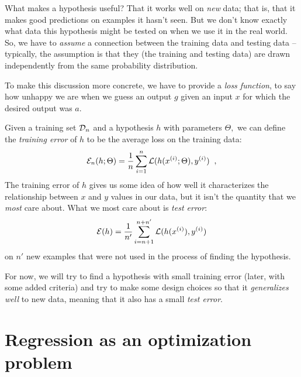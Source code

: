 What makes a hypothesis useful? That it works well on {\em new} data;
that is, that it makes good predictions on examples it hasn't
  seen. 
But we don't know exactly what data this hypothesis might be tested on
when we use it in the real world. So, we have to {\em{assume}} a
connection between the training data and testing data -- typically, the assumption is that
they (the training and testing data) are drawn independently from the same probability distribution.

To make this discussion more concrete, we have to provide a {\em loss
    function}, to say how unhappy we are when we guess an output $g$
given an input $x$ for which the desired output was $a$.

Given a training set ${\cal D}_n$ and a hypothesis $h$ with parameters $\Theta,$ we can define the
  {\em training error} of $h$ to be the average loss on the training data:
\begin{eqnarray}\label{erm}
  \mathcal{E}_n(h; \Theta) =  \frac{1}{n}\sum_{i = 1}^n
  \mathcal{L}(h(x^{(i)};\Theta), y^{(i)})\;\;,
\end{eqnarray}
The training error of $h$ gives us some idea of how well it
characterizes the relationship between $x$ and $y$ values in our data,
but it isn't the quantity that we {\em most} care about. What we most care about is
  {\em test error}:
\begin{eqnarray*}
  \mathcal{E}(h) = \frac{1}{n'}\sum_{i = n + 1}^{n + n'}
  \mathcal{L}(h(x^{(i)}), y^{(i)})
\end{eqnarray*}
on $n'$ new examples that were not used in the process of finding the
hypothesis.

For now, we will try to find a hypothesis with small training error
(later, with some added criteria) and try to make some design choices
so that it {\em{generalizes well}}
to new data, meaning that it also has a small {\em test error}.

\section{Regression as an optimization problem}

